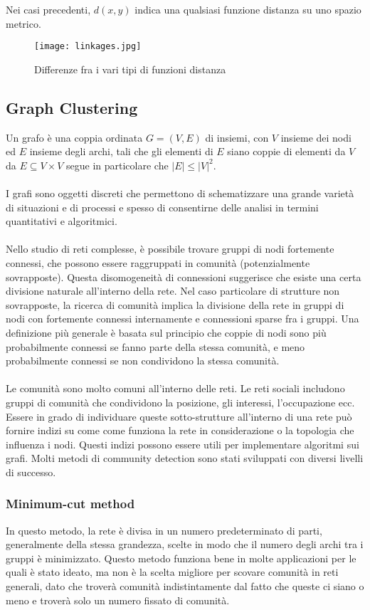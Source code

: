 Nei casi precedenti, $ d\left ( x, y \right )$ indica una qualsiasi funzione distanza su uno spazio metrico.
\begin{figure}[htb]
	\centering
	\texttt{[image: linkages.jpg]}
	\caption{Differenze fra i vari tipi di funzioni distanza}
	\label{linkages}
\end{figure}

\subsection{Graph Clustering}
Un grafo è una coppia ordinata $ G = (V, E)$ di insiemi, con $V$ insieme dei nodi ed $E$ insieme degli archi, tali che gli elementi di $E$ siano coppie di elementi da $V$ da $ E \subseteq V\times V$ segue in particolare che  $|E|\le |V|^2$.
\\\\
I grafi sono oggetti discreti che permettono di schematizzare una grande varietà di situazioni e di processi e spesso di consentirne delle analisi in termini quantitativi e algoritmici.
\\\\
Nello studio di reti complesse, è possibile trovare gruppi di nodi fortemente connessi, che possono essere raggruppati in comunità (potenzialmente sovrapposte). Questa disomogeneità di connessioni suggerisce che esiste una certa divisione naturale all’interno della rete. Nel caso particolare di strutture non sovrapposte, la ricerca di comunità implica la divisione della rete in gruppi di nodi con fortemente connessi internamente e connessioni sparse fra i gruppi.
Una definizione più generale è basata sul principio che coppie di nodi sono più probabilmente connessi se fanno parte della stessa comunità, e meno probabilmente connessi se non condividono la stessa comunità.
\\\\
Le comunità sono molto comuni all’interno delle reti. Le reti sociali includono gruppi di comunità che condividono la posizione, gli interessi, l’occupazione ecc. Essere in grado di individuare queste sotto-strutture all’interno di una rete può fornire indizi  su come come funziona la rete in considerazione o la topologia che influenza i nodi. Questi indizi possono essere utili per implementare algoritmi sui grafi. Molti metodi di community detection sono stati sviluppati con diversi livelli di successo.

\subsubsection{Minimum-cut method}
In questo metodo, la rete è divisa in un numero predeterminato di parti, generalmente della stessa grandezza, scelte in modo che il numero degli archi tra i gruppi è minimizzato. Questo metodo funziona bene in molte applicazioni per le quali è stato ideato, ma non è la scelta migliore per scovare comunità in reti generali, dato che troverà comunità indistintamente dal fatto che queste ci siano o meno e troverà solo un numero fissato di comunità.

